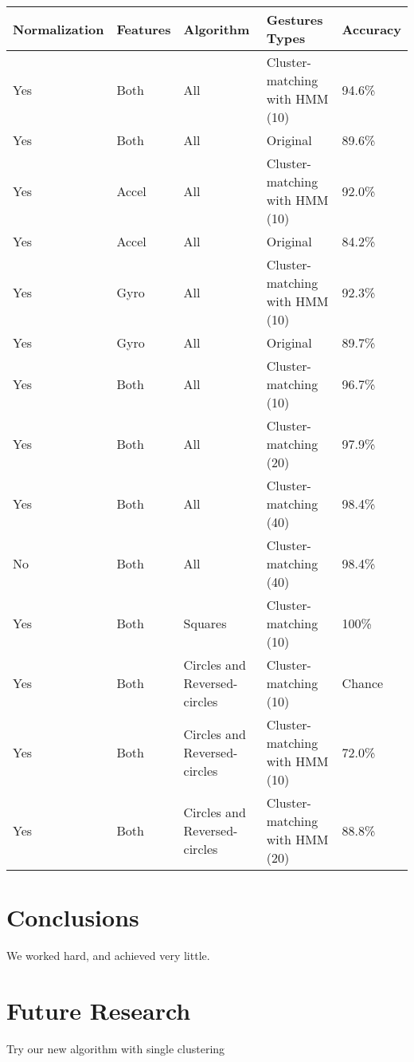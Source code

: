 \documentclass[12pt]{article}
\begin{document}
\begin{center}
\begin{tabular}{ | l | l | l | l | l | }
  \hline
  Normalization & Features & Algorithm & Gestures Types & Accuracy \\ \hline
  Yes	&	Both  &	All & Cluster-matching with HMM (10) &	94.6\% \\ \hline
  Yes	&	Both	&	All & Original  &	89.6\% \\ \hline
  Yes	&	Accel &	All & Cluster-matching with HMM (10) &	92.0\% \\ \hline
  Yes	&	Accel &	All &	Original & 84.2\% \\ \hline
  Yes	&	Gyro  &	All & Cluster-matching with HMM (10) & 92.3\% \\ \hline
  Yes	&	Gyro  &	All & Original &  89.7\% \\ \hline
  Yes	&	Both	&	All &	Cluster-matching (10) &  96.7\% \\ \hline
  Yes	&	Both	&	All &	Cluster-matching (20) &  97.9\% \\ \hline
  Yes	&	Both  &	All &	Cluster-matching (40) & 	98.4\% \\ \hline
  No	&	Both	&	All &	Cluster-matching (40) & 	98.4\% \\ \hline
  Yes	&	Both	& Squares &	Cluster-matching (10) & 	100\% \\ \hline
  Yes	&	Both	& Circles and Reversed-circles  &	Cluster-matching (10) & 	Chance \\ \hline
  Yes	&	Both	& Circles and Reversed-circles  &	Cluster-matching with HMM (10) &	72.0\% \\ \hline
  Yes	&	Both  & Circles and Reversed-circles  &	Cluster-matching with HMM (20) & 88.8\% \\
  \hline
\end{tabular}
\end{center}

\section{Conclusions}\label{conclusions}
We worked hard, and achieved very little.

\section{Future Research}
Try our new algorithm with single clustering



\end{document}
